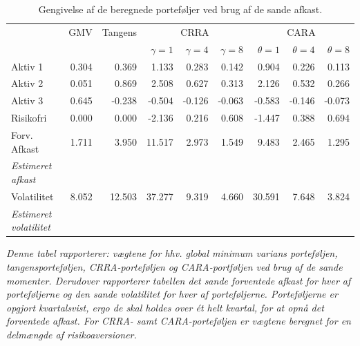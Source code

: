 \documentclass[
  a4paper,
  oneside]{memoir}
\begin{document}
\begin{table}[H]

\caption{\label{tab:sum-true}Gengivelse af de beregnede porteføljer ved brug af de sande afkast.}
\centering
\begin{threeparttable}
\begin{tabular}[t]{lrrrrrrrr}
\toprule
\multicolumn{1}{c}{ } & \multicolumn{1}{c}{GMV} & \multicolumn{1}{c}{Tangens} & \multicolumn{3}{c}{CRRA} & \multicolumn{3}{c}{CARA} \\
\cmidrule(l{3pt}r{3pt}){2-2} \cmidrule(l{3pt}r{3pt}){3-3} \cmidrule(l{3pt}r{3pt}){4-6} \cmidrule(l{3pt}r{3pt}){7-9}
  &   &   & $\gamma=1$ & $\gamma=4$ & $\gamma=8$ & $\theta=1$ & $\theta=4$ & $\theta=8$\\
\midrule
\rowcolor{gray!6}  Aktiv 1 & 0.304 & 0.369 & 1.133 & 0.283 & 0.142 & 0.904 & 0.226 & 0.113\\
Aktiv 2 & 0.051 & 0.869 & 2.508 & 0.627 & 0.313 & 2.126 & 0.532 & 0.266\\
\rowcolor{gray!6}  Aktiv 3 & 0.645 & -0.238 & -0.504 & -0.126 & -0.063 & -0.583 & -0.146 & -0.073\\
Risikofri & 0.000 & 0.000 & -2.136 & 0.216 & 0.608 & -1.447 & 0.388 & 0.694\\
\rowcolor{gray!6}  Forv. Afkast & 1.711 & 3.950 & 11.517 & 2.973 & 1.549 & 9.483 & 2.465 & 1.295\\
\em{Estimeret afkast} & \em{} & \em{} & \em{} & \em{} & \em{} & \em{} & \em{} & \em{}\\
\rowcolor{gray!6}  Volatilitet & 8.052 & 12.503 & 37.277 & 9.319 & 4.660 & 30.591 & 7.648 & 3.824\\
\em{Estimeret volatilitet} & \em{} & \em{} & \em{} & \em{} & \em{} & \em{} & \em{} & \em{}\\
\bottomrule
\end{tabular}
\begin{tablenotes}
\item \textit{Denne tabel rapporterer: vægtene for hhv. global minimum varians porteføljen, tangensporteføljen, CRRA-porteføljen og CARA-portføljen ved brug af de sande momenter. Derudover rapporterer tabellen det sande forventede afkast for hver af porteføljerne og den sande volatilitet for hver af porteføljerne. Porteføljerne er opgjort kvartalsvist, ergo de skal holdes over ét helt kvartal, for at opnå det forventede afkast. For CRRA- samt CARA-porteføljen er vægtene beregnet for en delmængde af risikoaversioner.}
\end{tablenotes}
\end{threeparttable}
\end{table}
\end{document}
